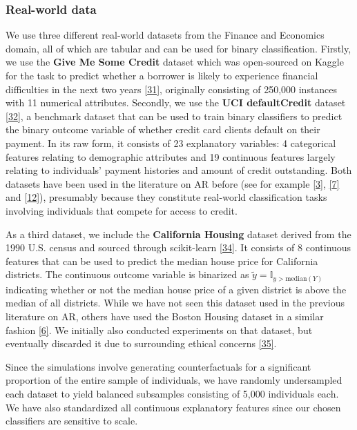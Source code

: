 \documentclass[conference,final,]{IEEEtran}
\theoremstyle{definition}
\theoremstyle{definition}
\theoremstyle{definition}
\theoremstyle{definition}
\theoremstyle{remark}
\begin{document}
\hypertarget{real-world-data}{%
\subsubsection{Real-world data}\label{real-world-data}}

We use three different real-world datasets from the Finance and Economics domain, all of which are tabular and can be used for binary classification. Firstly, we use the \textbf{Give Me Some Credit} dataset which was open-sourced on Kaggle for the task to predict whether a borrower is likely to experience financial difficulties in the next two years \protect\hyperlink{ref-kaggle2011give}{{[}31{]}}, originally consisting of 250,000 instances with 11 numerical attributes. Secondly, we use the \textbf{UCI defaultCredit} dataset \protect\hyperlink{ref-yeh2009comparisons}{{[}32{]}}, a benchmark dataset that can be used to train binary classifiers to predict the binary outcome variable of whether credit card clients default on their payment. In its raw form, it consists of 23 explanatory variables: 4 categorical features relating to demographic attributes and 19 continuous features largely relating to individuals' payment histories and amount of credit outstanding. Both datasets have been used in the literature on AR before (see for example \protect\hyperlink{ref-pawelczyk2021carla}{{[}3{]}}, \protect\hyperlink{ref-joshi2019realistic}{{[}7{]}} and \protect\hyperlink{ref-ustun2019actionable}{{[}12{]}}), presumably because they constitute real-world classification tasks involving individuals that compete for access to credit.

As a third dataset, we include the \textbf{California Housing} dataset derived from the 1990 U.S. census and sourced through scikit-learn \protect\hyperlink{ref-pace1997sparse}{{[}34{]}}. It consists of 8 continuous features that can be used to predict the median house price for California districts. The continuous outcome variable is binarized as \(\tilde{y}=\mathbb{I}_{y>\text{median}(Y)}\) indicating whether or not the median house price of a given district is above the median of all districts. While we have not seen this dataset used in the previous literature on AR, others have used the Boston Housing dataset in a similar fashion \protect\hyperlink{ref-schut2021generating}{{[}6{]}}. We initially also conducted experiments on that dataset, but eventually discarded it due to surrounding ethical concerns \protect\hyperlink{ref-carlisle2019racist}{{[}35{]}}.

Since the simulations involve generating counterfactuals for a significant proportion of the entire sample of individuals, we have randomly undersampled each dataset to yield balanced subsamples consisting of 5,000 individuals each. We have also standardized all continuous explanatory features since our chosen classifiers are sensitive to scale.
\end{document}
